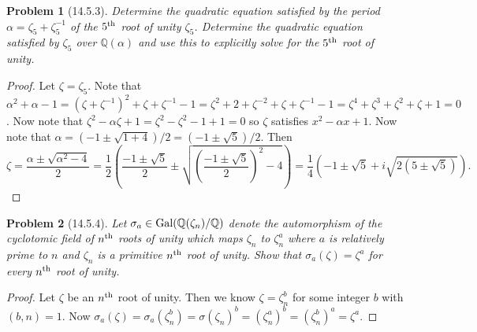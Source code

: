 \documentclass{article}
\newcommand{\gal}{\textup{Gal}}
\newtheorem{problem}{Problem}
\begin{document}

\begin{problem}[14.5.3]
Determine the quadratic equation satisfied by the period $\alpha = \zeta_5 + \zeta_5^{-1}$ of the $5^{\textup{th}}$ root of unity $\zeta_5$. Determine the quadratic equation satisfied by $\zeta_5$ over $\mathbb{Q}(\alpha)$ and use this to explicitly solve for the $5^{\textup{th}}$ root of unity.
\end{problem}
\begin{proof}
Let $\zeta = \zeta_5$. Note that $\alpha^2 + \alpha - 1 = (\zeta + \zeta^{-1})^2 + \zeta + \zeta^{-1} - 1 = \zeta^2 + 2 + \zeta^{-2} + \zeta + \zeta^{-1} - 1 = \zeta^4 + \zeta^3 + \zeta^2 + \zeta + 1 = 0$. Now note that $\zeta^2 - \alpha \zeta + 1 = \zeta^2 - \zeta^2 - 1 + 1 = 0$ so $\zeta$ satisfies $x^2 -\alpha x + 1$. Now note that $\alpha = (-1 \pm \sqrt{1 + 4})/2 = (-1 \pm \sqrt{5})/2$. Then
\[
\zeta = \frac{\alpha \pm \sqrt{\alpha^2 - 4}}{2} =  \frac{1}{2} \left ( \frac{-1 \pm \sqrt{5}}{2} \pm \sqrt{ \left (\frac{-1 \pm \sqrt{5}}{2} \right )^2 - 4} \right) = \frac{1}{4} \left (-1 \pm \sqrt{5} + i\sqrt{2(5 \pm \sqrt{5})} \right ).
\]
\end{proof}

\begin{problem}[14.5.4]
Let $\sigma_a \in \gal(\mathbb{Q}(\zeta_n)/\mathbb{Q})$ denote the automorphism of the cyclotomic field of $n^{\textup{th}}$ roots of unity which maps $\zeta_n$ to $\zeta_n^a$ where $a$ is relatively prime to $n$ and $\zeta_n$ is a primitive $n^{\textup{th}}$ root of unity. Show that $\sigma_a(\zeta) = \zeta^a$ for \emph{every} $n^{\textup{th}}$ root of unity.
\end{problem}
\begin{proof}
Let $\zeta$ be an $n^{\textup{th}}$ root of unity. Then we know $\zeta = \zeta_n^b$ for some integer $b$ with $(b,n) = 1$. Now $\sigma_a(\zeta) = \sigma_a(\zeta_n^b) = \sigma(\zeta_n)^b = (\zeta_n^a)^b = (\zeta_n^b)^a = \zeta^a$.
\end{proof}
\end{document}
